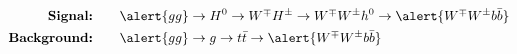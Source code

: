 \documentclass[xcolor=table,8pt]{beamer}
\begin{document}
\begin{frame}[t]
        \vspace{-20pt}
        \begin{align}
            \text{\bfseries Signal:} \qquad&\alert{gg} \to
                H^{0}
                \to
                W^{\mp} H^{\pm}
                \to
                W^{\mp} W^{\pm} h^{0}
                \to
                \alert{W^{\mp} W^{\pm} b \bar{b}}
                \\
            \text{\bfseries Background:} \qquad&\alert{gg} \to
                g
                \to
                t \bar{t}
                \to
                \alert{W^{\mp} W^{\pm} b \bar{b}}
        \end{align}
    \end{frame}
    
    
    
\end{document}
